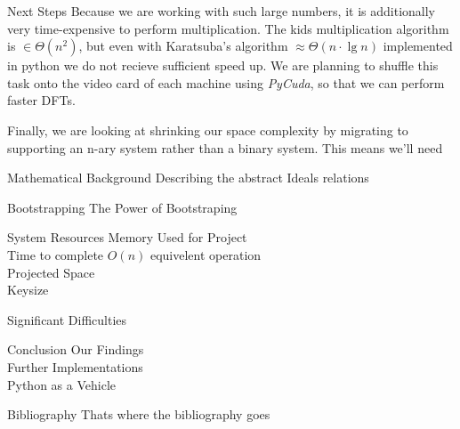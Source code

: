 \documentclass[a0,portrait]{a0poster}
\begin{document}
\begin{multicols}{2}
\begin{slide}{Next Steps}
  Because we are working with such large numbers, it is additionally very time-expensive to perform multiplication. The kids multiplication algorithm is \(\in\Theta(n^2)\), but even with Karatsuba's algorithm \(\approx\Theta(n\cdot\lg n)\) implemented in python we do not recieve sufficient speed up. We are planning to shuffle this task onto the video card of each machine using {\em PyCuda}, so that we can perform faster DFTs. 

  Finally, we are looking at shrinking our space complexity by migrating to supporting an n-ary system rather than a binary system. This means we'll need 
\end{slide}

\begin{slide}{Mathematical Background}
Describing the abstract Ideals relations
\end{slide}

\begin{slide}{Bootstrapping}
The Power of Bootstraping
\end{slide}

\begin{slide}{System Resources}
Memory Used for Project \\ Time to complete \(O(n)\) equivelent operation \\ Projected Space \\ Keysize 
\end{slide}

\begin{slide}{Significant Difficulties}

\end{slide}

\begin{slide}{Conclusion}
Our Findings \\ Further Implementations \\ Python as a Vehicle
\end{slide}

\begin{slide}{Bibliography}
Thats where the bibliography goes
\end{slide}
\end{multicols}
\end{document}

